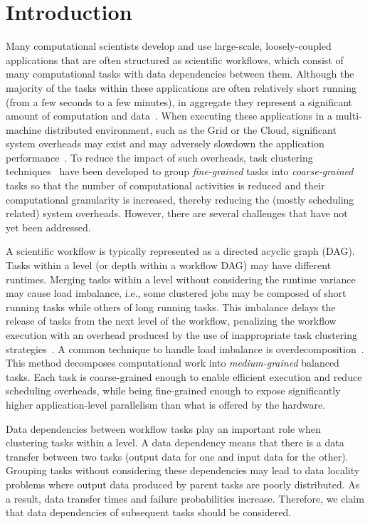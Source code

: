 
\section{Introduction}
\label{intro}
Many computational scientists develop and use large-scale, loosely-coupled applications that are often structured as scientific workflows, which consist of many computational tasks with data dependencies between them. Although the majority of the tasks within these applications are often relatively short running (from a few seconds to a few minutes), in aggregate they represent a significant amount of computation and data~\cite{daSilva:2013:TFO:2534248.2534254,Juve2013}. When executing these applications in a multi-machine distributed environment, such as the Grid or the Cloud, significant system overheads may exist and may adversely slowdown the application performance~\cite{Chen2011}. To reduce the impact of such overheads, task clustering techniques~\cite{Muthuvelu:2005:DJG:1082290.1082297,4493929,Muthuvelu2010,Muthuvelu2013170,keat-2006,ang-2009,Liu2009,Singh:2008:WTC:1341811.1341822,Ferreira-granularity-2013} have been developed to group \emph{fine-grained} tasks into \emph{coarse-grained} tasks so that the number of computational activities is reduced and their computational granularity is increased, thereby reducing the (mostly scheduling related) system overheads.
However, there are several challenges that have not yet been addressed.

A scientific workflow is typically represented as a directed acyclic graph (DAG). Tasks within a level (or depth within a workflow DAG) may have different runtimes. Merging tasks within a level without considering the runtime variance may cause load imbalance, i.e., some clustered jobs may be composed of short running tasks while others of long running tasks. This imbalance delays the release of tasks from the next level of the workflow, penalizing the workflow execution with an overhead produced by the use of inappropriate task clustering strategies~\cite{Chen2013}.
A common technique to handle load imbalance is overdecomposition~\cite{Lifflander}.
This method decomposes computational work into \emph{medium-grained} balanced tasks. Each task is coarse-grained enough to enable efficient execution and reduce scheduling overheads, while being fine-grained enough to expose significantly higher application-level parallelism than what is offered by the hardware. 

Data dependencies between workflow tasks play an important role when clustering tasks within a level. A data dependency means that there is a data transfer between two tasks (output data for one and input data for the other). Grouping tasks without considering these dependencies may lead to data locality problems where output data produced by parent tasks are poorly distributed. As a result, data transfer times and failure probabilities increase.
Therefore, we claim that data dependencies of subsequent tasks should be considered.

